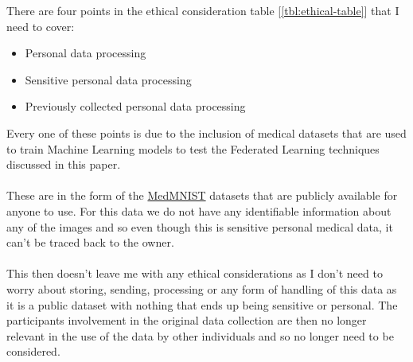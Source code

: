 There are four points in the ethical consideration table [\ref{tbl:ethical-table}] that I need to cover:
\begin{itemize}
    \item Personal data processing
    \item Sensitive personal data processing
    \item Previously collected personal data processing
\end{itemize}
Every one of these points is due to the inclusion of medical datasets that are used to train Machine Learning models to test the Federated Learning techniques discussed in this paper.\\ \\
These are in the form of the \href{https://medmnist.github.io/}{MedMNIST} datasets that are publicly available for anyone to use. For this data we do not have any identifiable information about any of the images and so even though this is sensitive personal medical data, it can't be traced back to the owner.\\ \\
This then doesn't leave me with any ethical considerations as I don't need to worry about storing, sending, processing or any form of handling of this data as it is a public dataset with nothing that ends up being sensitive or personal. The participants involvement in the original data collection are then no longer relevant in the use of the data by other individuals and so no longer need to be considered.